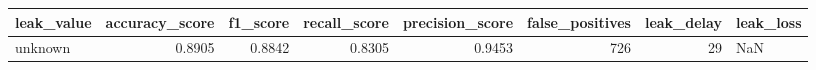 \begin{tabular}{lrrrrrrl}
\toprule
leak\_value & accuracy\_score & f1\_score & recall\_score & precision\_score & false\_positives & leak\_delay & leak\_loss \\
\midrule
unknown & 0.8905 & 0.8842 & 0.8305 & 0.9453 & 726 & 29 & NaN \\
\bottomrule
\end{tabular}
